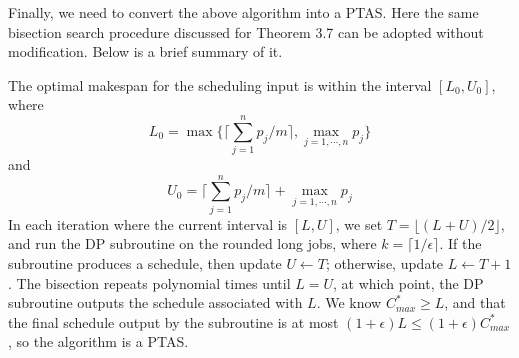 \documentclass{article}
\begin{document}
Finally, we need to convert the above algorithm into a PTAS. Here the same bisection search procedure discussed for Theorem 3.7 can be adopted without modification. Below is a brief summary of it.\par 
The optimal makespan for the scheduling input is within the interval $[L_0, U_0]$, where
$$L_0 = \max\Bigg\{\Bigg\lceil\sum_{j=1}^{n}p_j/m\Bigg\rceil, \max_{j=1,\cdots,n}p_j\Bigg\}$$
and
$$U_0 = \Bigg\lceil\sum_{j=1}^{n}p_j/m\Bigg\rceil + \max_{j=1,\cdots,n}p_j$$
In each iteration where the current interval is $[L, U]$, we set $T =\lfloor(L + U)/2\rfloor$, and run the DP subroutine on the rounded long jobs, where $k = \lceil 1/\epsilon \rceil$. If the subroutine produces a schedule, then update $U \leftarrow T$; otherwise, update $L \leftarrow T + 1$. The bisection repeats polynomial times until $L = U$, at which point, the DP subroutine outputs the schedule associated with $L$. We know $C_{max}^* \geq L$, and that the final schedule output by the subroutine is at most $(1+\epsilon)L \leq (1+\epsilon)C_{max}^{*}$, so the algorithm is a PTAS.
\end{document}

